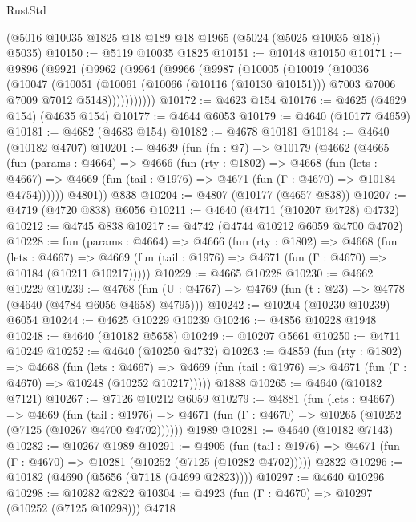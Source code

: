 \begin{lexlean}{RustStd}
\begin{coremodule}
    (@5016 @10035 @1825 @18 @189 @18 @1965 (@5024 (@5025 @10035 @18)) @5035)
@10150 := @5119 @10035 @1825
@10151 := @10148 @10150
@10171 := @9896
    (@9921
      (@9962
        (@9964
          (@9966
            (@9987
              (@10005
                (@10019
                  (@10036
                    (@10047
                      (@10051
                        (@10061
                          (@10066 (@10116 (@10130 @10151)))
                          @7003
                          @7006
                          @7009
                          @7012
                          @5148)))))))))))
@10172 := @4623 @154
@10176 := @4625 (@4629 @154) (@4635 @154)
@10177 := @4644 @6053
@10179 := @4640 (@10177 @4659)
@10181 := @4682 (@4683 @154)
@10182 := @4678 @10181
@10184 := @4640 (@10182 @4707)
@10201 := @4639
    (fun (fn : @7) =>
    @10179
      (@4662
        (@4665
          (fun (params : @4664) =>
          @4666
            (fun (rty : @1802) =>
            @4668
              (fun (lets : @4667) =>
              @4669 (fun (tail : @1976) => @4671 (fun (Γ : @4670) => @10184 @4754))))))
        @4801))
    @838
@10204 := @4807 (@10177 (@4657 @838))
@10207 := @4719 (@4720 @838) @6056
@10211 := @4640 (@4711 (@10207 @4728) @4732)
@10212 := @4745 @838
@10217 := @4742 (@4744 @10212 @6059 @4700 @4702)
@10228 := fun (params : @4664) =>
  @4666
    (fun (rty : @1802) =>
    @4668
      (fun (lets : @4667) =>
      @4669 (fun (tail : @1976) => @4671 (fun (Γ : @4670) => @10184 (@10211 @10217)))))
@10229 := @4665 @10228
@10230 := @4662 @10229
@10239 := @4768
    (fun (U : @4767) => @4769 (fun (t : @23) => @4778 (@4640 (@4784 @6056 @4658) @4795)))
@10242 := @10204 (@10230 @10239) @6054
@10244 := @4625 @10229 @10239
@10246 := @4856 @10228 @1948
@10248 := @4640 (@10182 @5658)
@10249 := @10207 @5661
@10250 := @4711 @10249
@10252 := @4640 (@10250 @4732)
@10263 := @4859
    (fun (rty : @1802) =>
    @4668
      (fun (lets : @4667) =>
      @4669 (fun (tail : @1976) => @4671 (fun (Γ : @4670) => @10248 (@10252 @10217)))))
    @1888
@10265 := @4640 (@10182 @7121)
@10267 := @7126 @10212 @6059
@10279 := @4881
    (fun (lets : @4667) =>
    @4669
      (fun (tail : @1976) =>
      @4671 (fun (Γ : @4670) => @10265 (@10252 (@7125 (@10267 @4700 @4702))))))
    @1989
@10281 := @4640 (@10182 @7143)
@10282 := @10267 @1989
@10291 := @4905
    (fun (tail : @1976) => @4671 (fun (Γ : @4670) => @10281 (@10252 (@7125 (@10282 @4702)))))
    @2822
@10296 := @10182 (@4690 (@5656 (@7118 (@4699 @2823))))
@10297 := @4640 @10296
@10298 := @10282 @2822
@10304 := @4923 (fun (Γ : @4670) => @10297 (@10252 (@7125 @10298))) @4718

\end{coremodule}
\end{lexlean}
